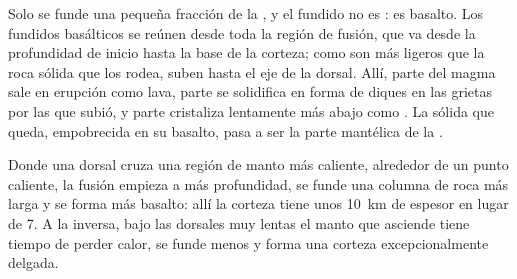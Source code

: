 Solo se funde una pequeña fracción de la , y el fundido no es
: es basalto. Los fundidos basálticos se reúnen desde toda la región
de fusión, que va desde la profundidad de inicio hasta la base de la corteza;
como son más ligeros que la roca sólida que los rodea, suben hasta el eje de
la dorsal. Allí, parte del magma sale en erupción como lava, parte se
solidifica en forma de diques en las grietas por las que subió, y parte
cristaliza lentamente más abajo como . La  sólida que queda,
empobrecida en su basalto, pasa a ser la parte mantélica de la .

Donde una dorsal cruza una región de manto más caliente, alrededor de un punto
caliente, la fusión empieza a más profundidad, se funde una columna de roca
más larga y se forma más basalto: allí la corteza tiene unos \qty{10}{km} de
espesor en lugar de 7. A la inversa, bajo las dorsales muy lentas el manto que
asciende tiene tiempo de perder calor, se funde menos y forma una corteza
excepcionalmente delgada.

